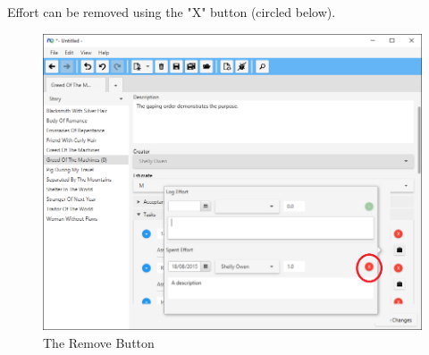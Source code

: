 Effort can be removed using the "X" button (circled below).

\begin{figure}[H]
\centering
\includegraphics[width=\textwidth]{images/screenshots/logging5.png}
\caption{The Remove Button}
\label{fig:new_project}
\end{figure}